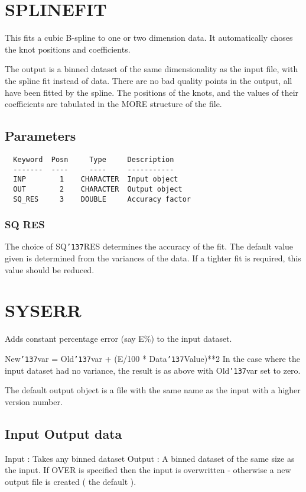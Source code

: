 \documentclass{book}
\renewcommand{\_}{{\tt\char'137}}     %
\begin{document}
\section{SPLINEFIT}
This fits a cubic B-spline to one or two dimension data. It
automatically choses the knot positions and coefficients.

The output is a binned dataset of the same dimensionality as
the input file, with the spline fit instead of data. There are
no bad quality points in the output, all have been fitted by
the spline. The positions of the knots, and the values of their
coefficients are tabulated in the MORE structure of the file.

\subsection{Parameters}
\begin{verbatim}
  Keyword  Posn     Type     Description
  -------  ----     ----     -----------
  INP        1    CHARACTER  Input object
  OUT        2    CHARACTER  Output object
  SQ_RES     3    DOUBLE     Accuracy factor

\end{verbatim}\subsubsection{SQ RES}
The choice of SQ\_RES determines the accuracy of the fit. The
default value given is determined from the variances of the
data. If a tighter fit is required, this value should be
reduced.

\section{SYSERR}
Adds constant percentage error (say E\%) to the input dataset.

New\_var = Old\_var + (E/100 * Data\_Value)**2
In the case where the input dataset had no variance, the result
is as above with Old\_var set to zero.

The default output object is a file with the same name as the
input with a higher version number.

\subsection{Input Output data}
Input : Takes any binned dataset
Output : A binned dataset of the same size as
the input. If OVER is specified then
the input is overwritten - otherwise
a new output file is created ( the
default ).
\end{document}

